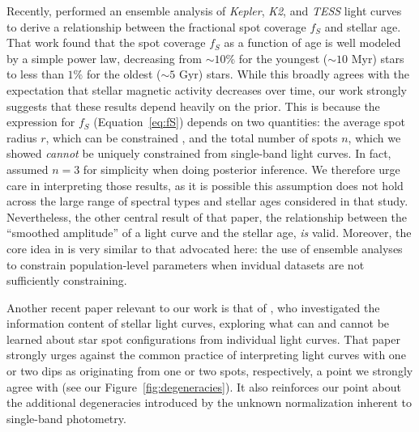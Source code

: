 \documentclass[modern]{aastex62}
\begin{document}
Recently, \citet{Morris2020} performed an ensemble analysis of
\emph{Kepler}, \emph{K2}, and \emph{TESS}
light curves to derive a relationship between the fractional spot
coverage $f_S$ and stellar age.
%
That work found that the spot coverage $f_S$ as a
function of age is well modeled by a simple power law, decreasing from
${\sim}10\%$ for the youngest (${\sim}10$ Myr) stars
to less than $1\%$ for the oldest (${\sim}5$ Gyr) stars.
%
While this broadly agrees with the expectation that stellar
magnetic activity decreases over time, our work strongly suggests
that these results depend heavily on the prior.
%
This is because the expression for $f_S$ (Equation~\ref{eq:fS}) depends on
two quantities: the average spot radius $r$, which can be
constrained \citep[see][]{PaperII}, and the total number of spots $n$, which
we showed \emph{cannot} be uniquely constrained from single-band light curves.
%
In fact, \citet{Morris2020} assumed $n=3$ for simplicity when doing
posterior inference. We therefore urge care in interpreting those results,
as it is possible this assumption does not hold across the large
range of spectral types and stellar ages considered in that study.
%
Nevertheless, the other central result of that paper, the relationship
between the ``smoothed amplitude'' of a light curve and the stellar age,
\emph{is} valid.
%
Moreover, the core idea in \citet{Morris2020}
\citep[and in related studies such as][]{Jackson2013}
is very similar
to that advocated here: the use of ensemble analyses to constrain population-level
parameters when invidual datasets are not sufficiently constraining.

Another recent paper relevant to our work is that of \citet{Basri2020}, who
investigated the information content of stellar light curves, exploring what
can and cannot be learned about star spot configurations from individual
light curves. That paper strongly urges against the common practice
of interpreting
light curves with one or two dips as originating from one or two spots,
respectively, a point we strongly agree with (see our Figure~\ref{fig:degeneracies}).
It also reinforces our point about the additional degeneracies introduced
by the unknown normalization inherent to single-band photometry.
%
\end{document}
